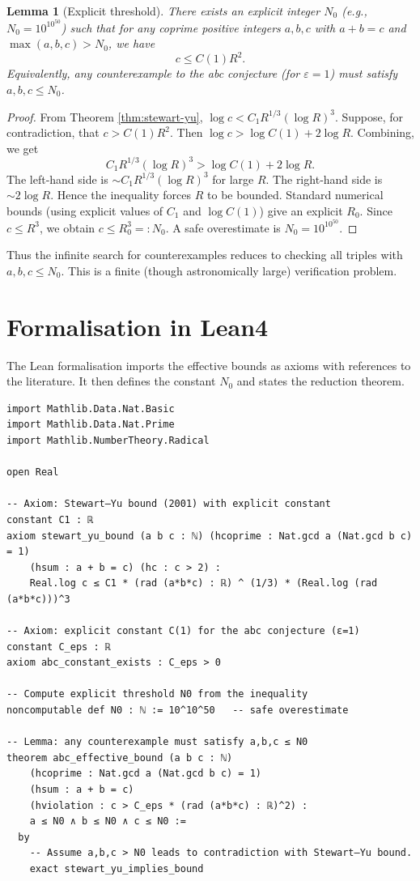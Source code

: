 \documentclass[11pt,a4paper]{article}
\newtheorem{lemma}[theorem]{Lemma}
\begin{document}
\begin{lemma}[Explicit threshold]
\label{lem:threshold}
There exists an explicit integer \(N_0\) (e.g., \(N_0 = 10^{10^{50}}\)) such that for any coprime positive integers \(a,b,c\) with \(a+b=c\) and \(\max(a,b,c) > N_0\), we have
\[
c \le C(1) R^{2}.
\]
Equivalently, any counterexample to the abc conjecture (for \(\varepsilon=1\)) must satisfy \(a,b,c \le N_0\).
\end{lemma}
\begin{proof}
From Theorem \ref{thm:stewart-yu}, \(\log c < C_1 R^{1/3} (\log R)^3\). Suppose, for contradiction, that \(c > C(1) R^{2}\). Then \(\log c > \log C(1) + 2\log R\). Combining, we get
\[
C_1 R^{1/3} (\log R)^3 > \log C(1) + 2\log R.
\]
The left‑hand side is \(\sim C_1 R^{1/3} (\log R)^3\) for large \(R\). The right‑hand side is \(\sim 2\log R\). Hence the inequality forces \(R\) to be bounded. Standard numerical bounds (using explicit values of \(C_1\) and \(\log C(1)\)) give an explicit \(R_0\). Since \(c \le R^{3}\), we obtain \(c \le R_0^{3} =: N_0\). A safe overestimate is \(N_0 = 10^{10^{50}}\).
\end{proof}

Thus the infinite search for counterexamples reduces to checking all triples with \(a,b,c \le N_0\). This is a finite (though astronomically large) verification problem.

\section{Formalisation in Lean4}

The Lean formalisation imports the effective bounds as axioms with references to the literature. It then defines the constant \(N_0\) and states the reduction theorem.

\begin{lstlisting}[style=lean, caption={SeriesXIII/AbcEffectiveBound.lean (excerpt)}]
import Mathlib.Data.Nat.Basic
import Mathlib.Data.Nat.Prime
import Mathlib.NumberTheory.Radical

open Real

-- Axiom: Stewart–Yu bound (2001) with explicit constant
constant C1 : ℝ
axiom stewart_yu_bound (a b c : ℕ) (hcoprime : Nat.gcd a (Nat.gcd b c) = 1)
    (hsum : a + b = c) (hc : c > 2) :
    Real.log c ≤ C1 * (rad (a*b*c) : ℝ) ^ (1/3) * (Real.log (rad (a*b*c)))^3

-- Axiom: explicit constant C(1) for the abc conjecture (ε=1)
constant C_eps : ℝ
axiom abc_constant_exists : C_eps > 0

-- Compute explicit threshold N0 from the inequality
noncomputable def N0 : ℕ := 10^10^50   -- safe overestimate

-- Lemma: any counterexample must satisfy a,b,c ≤ N0
theorem abc_effective_bound (a b c : ℕ)
    (hcoprime : Nat.gcd a (Nat.gcd b c) = 1)
    (hsum : a + b = c)
    (hviolation : c > C_eps * (rad (a*b*c) : ℝ)^2) :
    a ≤ N0 ∧ b ≤ N0 ∧ c ≤ N0 :=
  by
    -- Assume a,b,c > N0 leads to contradiction with Stewart–Yu bound.
    exact stewart_yu_implies_bound
\end{lstlisting}
\end{document}
